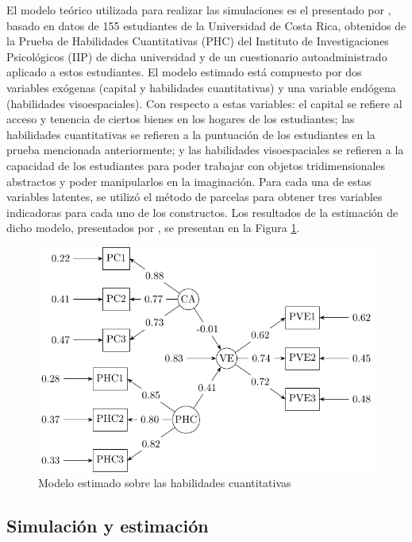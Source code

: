 \documentclass[english]{revcoles}
\begin{document}
El modelo teórico utilizada para realizar las simulaciones es el presentado por , basado en datos de 155 estudiantes de la Universidad de Costa Rica, obtenidos de la Prueba de Habilidades Cuantitativas (PHC) del Instituto de Investigaciones Psicológicos (IIP) de dicha universidad y de un cuestionario autoadministrado aplicado a estos estudiantes. El modelo estimado está compuesto por dos variables exógenas (capital y habilidades cuantitativas) y una variable endógena (habilidades visoespaciales). Con respecto a estas variables: el capital se refiere al acceso y tenencia de ciertos bienes en los hogares de los estudiantes; las habilidades cuantitativas se refieren a la puntuación de los estudiantes en la prueba mencionada anteriormente; y las habilidades visoespaciales se refieren a la capacidad de los estudiantes para poder trabajar con objetos tridimensionales abstractos y poder manipularlos en la imaginación. Para cada una de estas variables latentes, se utilizó el método de parcelas para obtener tres variables indicadoras para cada uno de los constructos. Los resultados de la estimación de dicho modelo, presentados por , se presentan en la Figura \ref{fig:mod_teorico}.

\begin{figure}[!h]
  \centering
  \includegraphics{model-figure0}
  \caption{Modelo estimado sobre las habilidades cuantitativas}
  \label{fig:mod_teorico}
\end{figure}

\subsection{Simulación y estimación}
\end{document}
